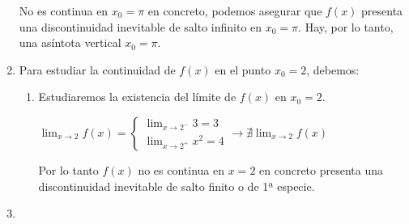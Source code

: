 \begin{enumerate}[label=\color{red}\textbf{\arabic*)}, leftmargin=*]
\qquad\begin{minipage}{0.4\textwidth}
No es continua en $x_0=\pi$ en concreto, podemos asegurar que $f(x)$ presenta una discontinuidad inevitable de salto infinito en $x_0=\pi$. Hay, por lo tanto, una asíntota vertical $x_0=\pi$.
\end{minipage}
\item {}

Para estudiar la continuidad de $f(x)$ en el punto $x_0=2$, debemos: 
\begin{enumerate}[label=\roman*)]
	\item Estudiaremos la existencia del límite de $f(x)$ en $x_0=2$. 
	\begin{center}
		$\lim_{x\to2}f(x)=\begin{cases}
			\lim_{x\to2^-}3=3\\
			\lim_{x\to 2^+}x^2=4
		\end{cases}\longrightarrow\nexists\lim_{x\to 2} f(x)~~$\begin{minipage}[t]{0.4\textwidth}
		Por lo tanto $f(x)$ no es continua en $x=2$ en concreto presenta una discontinuidad inevitable de salto finito o de 1ª especie.
		\end{minipage}
	\end{center}
\end{enumerate}
\item {}


\end{enumerate}
